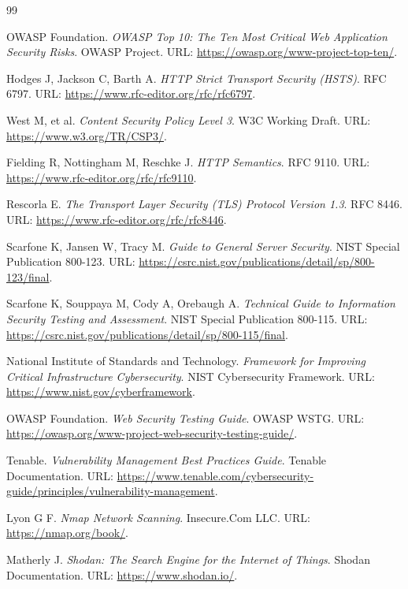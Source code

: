 \documentclass[12pt,a4paper,fontset=none]{ctexart}
\begin{document}
\clearpage
{}
{}
\begin{thebibliography}{99}

OWASP Foundation. \textit{OWASP Top 10: The Ten Most Critical Web Application Security Risks}. OWASP Project. URL: \url{https://owasp.org/www-project-top-ten/}.

Hodges J, Jackson C, Barth A. \textit{HTTP Strict Transport Security (HSTS)}. RFC 6797. URL: \url{https://www.rfc-editor.org/rfc/rfc6797}.

West M, et al. \textit{Content Security Policy Level 3}. W3C Working Draft. URL: \url{https://www.w3.org/TR/CSP3/}.

Fielding R, Nottingham M, Reschke J. \textit{HTTP Semantics}. RFC 9110. URL: \url{https://www.rfc-editor.org/rfc/rfc9110}.

Rescorla E. \textit{The Transport Layer Security (TLS) Protocol Version 1.3}. RFC 8446. URL: \url{https://www.rfc-editor.org/rfc/rfc8446}.

Scarfone K, Jansen W, Tracy M. \textit{Guide to General Server Security}. NIST Special Publication 800-123. URL: \url{https://csrc.nist.gov/publications/detail/sp/800-123/final}.

Scarfone K, Souppaya M, Cody A, Orebaugh A. \textit{Technical Guide to Information Security Testing and Assessment}. NIST Special Publication 800-115. URL: \url{https://csrc.nist.gov/publications/detail/sp/800-115/final}.

National Institute of Standards and Technology. \textit{Framework for Improving Critical Infrastructure Cybersecurity}. NIST Cybersecurity Framework. URL: \url{https://www.nist.gov/cyberframework}.

OWASP Foundation. \textit{Web Security Testing Guide}. OWASP WSTG. URL: \url{https://owasp.org/www-project-web-security-testing-guide/}.

Tenable. \textit{Vulnerability Management Best Practices Guide}. Tenable Documentation. URL: \url{https://www.tenable.com/cybersecurity-guide/principles/vulnerability-management}.

Lyon G F. \textit{Nmap Network Scanning}. Insecure.Com LLC. URL: \url{https://nmap.org/book/}.

Matherly J. \textit{Shodan: The Search Engine for the Internet of Things}. Shodan Documentation. URL: \url{https://www.shodan.io/}.


\end{thebibliography}
\end{document}
